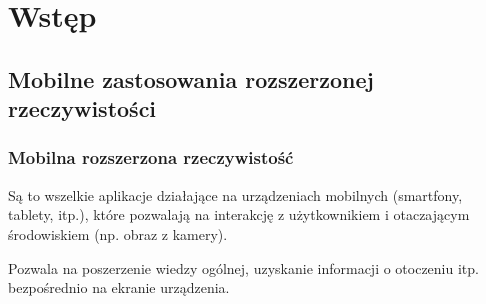 \section{Wstęp}
\nextoc 

\subsection{Mobilne zastosowania rozszerzonej rzeczywistości}
\begin{frame}
    \frametitle{Mobilna rozszerzona rzeczywistość}

    Są to wszelkie aplikacje działające na urządzeniach mobilnych (smartfony, tablety, itp.), które pozwalają na interakcję z użytkownikiem i otaczającym środowiskiem (np. obraz z kamery).

    Pozwala na poszerzenie wiedzy ogólnej, uzyskanie informacji o otoczeniu itp. bezpośrednio na ekranie urządzenia.
\end{frame}
